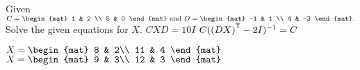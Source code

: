 
\begin{Exercise}[
name={},
title={}, 
difficulty=0,
origin={\cite{YL}}]
Given
$C = \begin{mat}
1 & 2 \\
5 & 0
\end{mat}\text{ and }
D = \begin{mat}
-1 & 1 \\
4 & -3
\end{mat}.
$ Solve the given equations for $X$.
\Question $CXD=10I$
\Question $C({{(DX)}^{\mathsf{T}}}-2I)^{-1}=C$
\end{Exercise}

\begin{Answer}
\begin{multicols}{2}
\Question $
X=
\begin{mat}
8 & 2\\
11 & 4
\end{mat}
$
\Question $
X=
\begin{mat}
9 & 3\\
12 & 3
\end{mat}
$
\EndCurrentQuestion
\end{multicols}
\end{Answer}
